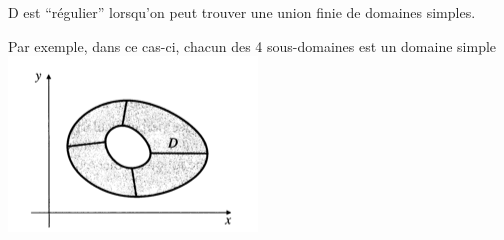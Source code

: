 \begin{myrem}
D est ``régulier'' lorsqu'on peut trouver une union finie de domaines simples.


Par exemple, dans ce cas-ci, chacun des 4 sous-domaines est un domaine simple\\
\includegraphics[scale=1]{image1.png}

\end{myrem}
